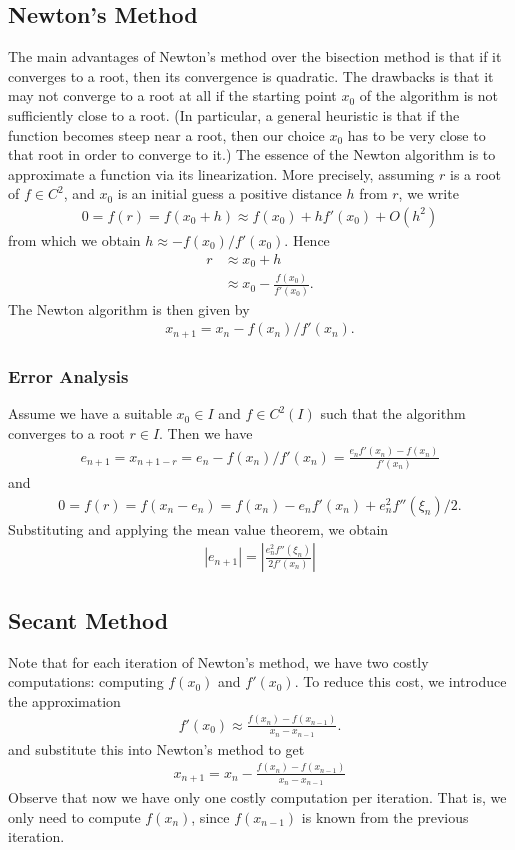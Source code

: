 \documentclass[12pt,reqno]{amsart}
\numberwithin{equation}{section}  %
\begin{document}
\subsection{Newton's Method}
The main advantages of Newton's method over the bisection method is that if it
converges to a root, then its convergence is quadratic. The drawbacks is that it
may not converge to a root at all if the starting point $x_0$ of the algorithm
is not sufficiently close to a root. (In particular, a general heuristic is that
if the function becomes steep near a root, then our choice $x_0$ has to be very
close to that root in order to converge to it.) The essence of the Newton
algorithm is to approximate a function via its linearization. More precisely,
assuming $r$ is a root of $f \in C^2$, and $x_0$ is an initial guess a positive
distance $h$ from $r$, we write
\begin{align*}
0 = f(r)  = f(x_0 + h) \approx f(x_0) + h f'(x_0) + O(h^2)
\end{align*}
from which we obtain $h \approx -f(x_0)/f'(x_0)$.
Hence
\begin{align*}
r & \approx x_0 + h \\
& \approx x_0 - \frac{f(x_0)}{f'(x_0)}.
\end{align*}
The Newton algorithm is then given by
\begin{align*}
x_{n+1} = x_{n} - f(x_n)/f'(x_n).
\end{align*}
\subsubsection{Error Analysis}
Assume we have a suitable $x_0 \in I$ and $f \in C^2(I)$ such that the algorithm converges
to a root $r \in I$. Then we have
\begin{align*}
e_{n+1} = x_{n+1 - r} = e_n - f(x_n)/f'(x_n) = \frac{e_n f'(x_n) - f(x_n)}{f'(x_n)}
\end{align*}
and 
\begin{align*}
0 = f(r) = f(x_n - e_n) = f(x_n) - e_n f'(x_n) + e_n^2 f''(\xi_n)/2.
\end{align*}
Substituting and applying the mean value theorem, we obtain 
\begin{align*}
| e_{n+1} | = \left | \frac{e_n^2 f''(\xi_n)}{2 f'(x_n)} \right |
\end{align*}

\subsection{Secant Method}
Note that for each iteration of Newton's method, we have
two costly computations: computing $f(x_0)$ and $f'(x_0)$.
To reduce this cost, we introduce the approximation
\begin{align*}
f'(x_0) \approx \frac{f(x_n) - f(x_{n-1})}{x_n - x_{n-1}}.
\end{align*}
and substitute this into Newton's method to get
\begin{align*}
x_{n+1} = x_n - \frac{f(x_n) - f(x_{n-1})}{x_n - x_{n-1}}
\end{align*}
Observe that now we have only one costly computation per iteration.
That is, we only need to compute $f(x_n)$, since $f(x_{n-1})$ is known
from the previous iteration. 
\end{document}
